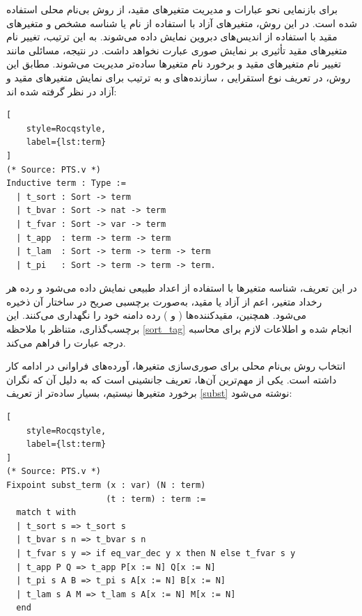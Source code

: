 \documentclass[11pt,twocolumn,a4paper,twoside]{article}
\theoremstyle{definition}
\theoremstyle{theorem}
\theoremstyle{definition}
\theoremstyle{definition}
\theoremstyle{definition}
\theoremstyle{definition}
\theoremstyle{definition}
\newcommand{\varname}[1]{\lr{\texttt{\footnotesize\detokenize{#1}}}}
\begin{document}
برای بازنمایی نحو عبارات و مدیریت متغیرهای مقید، از روش بی‌نام محلی استفاده شده است. در این روش، متغیرهای آزاد با استفاده از نام یا شناسه مشخص و متغیرهای مقید با استفاده از اندیس‌های دبروین نمایش داده می‌شوند. به این ترتیب، تغییر نام متغیرهای مقید تأثیری بر نمایش صوری عبارت نخواهد داشت. در نتیجه، مسائلی مانند تغییر نام متغیرهای مقید و برخورد نام متغیرها  ساده‌تر مدیریت می‌شوند. مطابق این روش، در تعریف نوع استقرایی \varname{term}، سازنده‌های \varname{t_bvar} و \varname{t_fvar} به ترتیب برای نمایش متغیرهای مقید و آزاد در نظر گرفته شده اند:
\begin{latin}
\begin{lstlisting}[
    style=Rocqstyle,
    label={lst:term}
]
(* Source: PTS.v *)
Inductive term : Type :=
  | t_sort : Sort -> term
  | t_bvar : Sort -> nat -> term
  | t_fvar : Sort -> var -> term
  | t_app  : term -> term -> term
  | t_lam  : Sort -> term -> term -> term
  | t_pi   : Sort -> term -> term -> term.
\end{lstlisting}
\end{latin}

در این تعریف، شناسه متغیرها با استفاده از اعداد طبیعی نمایش داده می‌شود و رده هر رخداد متغیر، اعم از آزاد یا مقید، به‌صورت برچسبی صریح در ساختار آن ذخیره می‌شود. همچنین، مقیدکننده‌ها (\varname{t_lam} و \varname{t_pi}) رده دامنه خود را نگهداری می‌کنند. این برچسب‌گذاری، متناظر با ملاحظه \ref{sort_tag} انجام شده و اطلاعات لازم برای محاسبه درجه عبارت را فراهم می‌کند.

انتخاب روش بی‌نام محلی برای صوری‌سازی متغیرها، آورده‌های فراوانی در ادامه کار داشته است. یکی از مهم‌ترین آن‌ها، تعریف جانشینی است که به دلیل آن که نگران برخورد متغیرها نیستیم، بسیار ساده‌تر از تعریف \ref{subst} نوشته می‌شود:

\begin{latin}
\begin{lstlisting}[
    style=Rocqstyle,
    label={lst:term}
]
(* Source: PTS.v *)
Fixpoint subst_term (x : var) (N : term) 
                    (t : term) : term :=
  match t with
  | t_sort s => t_sort s
  | t_bvar s n => t_bvar s n
  | t_fvar s y => if eq_var_dec y x then N else t_fvar s y
  | t_app P Q => t_app P[x := N] Q[x := N]
  | t_pi s A B => t_pi s A[x := N] B[x := N]
  | t_lam s A M => t_lam s A[x := N] M[x := N]
  end
\end{lstlisting}
\end{latin}
\end{document}
